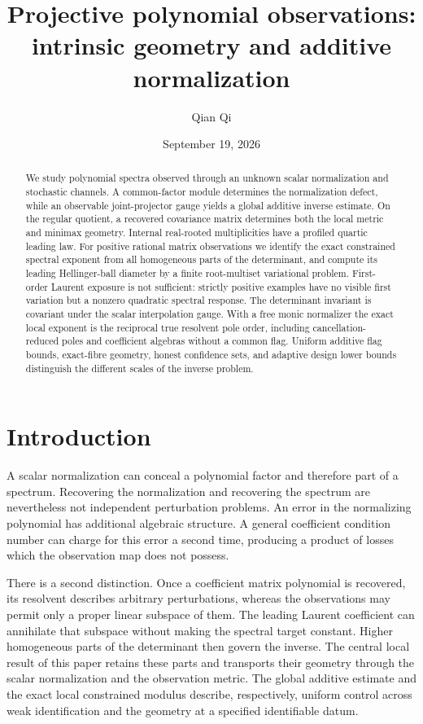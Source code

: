 \documentclass[11pt,reqno]{amsart}
\title[Projective polynomial observations]{Projective polynomial observations:\\ intrinsic geometry and additive normalization}
\author{Qian Qi}
\date{September 19, 2026}
\numberwithin{equation}{section}
\theoremstyle{definition}\newtheorem{definition}[theorem]{Definition}
\theoremstyle{remark}\newtheorem{remark}[theorem]{Remark}
\begin{document}
\begin{abstract}
We study polynomial spectra observed through an unknown scalar
normalization and stochastic channels. A common-factor module determines
the normalization defect, while an observable joint-projector gauge
yields a global additive inverse estimate. On the regular quotient,
a recovered covariance matrix determines both the local metric and
minimax geometry. Internal real-rooted multiplicities have a profiled
quartic leading law. For positive rational matrix observations we
identify the exact constrained spectral exponent from all homogeneous
parts of the determinant, and compute its leading Hellinger-ball
diameter by a finite root-multiset variational problem. First-order
Laurent exposure is not sufficient: strictly positive examples have
no visible first variation but a nonzero quadratic spectral response.
The determinant invariant is covariant under the scalar interpolation
gauge. With a free monic normalizer the exact local exponent is the
reciprocal true resolvent pole order, including cancellation-reduced
poles and coefficient algebras without a common flag. Uniform additive
flag bounds, exact-fibre geometry, honest confidence sets, and adaptive
design lower bounds distinguish the different scales of the inverse
problem.
\end{abstract}
\maketitle

\section{Introduction}
A scalar normalization can conceal a polynomial factor and therefore
part of a spectrum. Recovering the normalization and recovering the
spectrum are nevertheless not independent perturbation problems. An
error in the normalizing polynomial has additional algebraic structure.
A general coefficient condition number can charge for this error a
second time, producing a product of losses which the observation map
does not possess.

There is a second distinction. Once a coefficient matrix polynomial
is recovered, its resolvent describes arbitrary perturbations, whereas
the observations may permit only a proper linear subspace of them.
The leading Laurent coefficient can annihilate that subspace without
making the spectral target constant. Higher homogeneous parts of the
determinant then govern the inverse. The central local result of this
paper retains these parts and transports their geometry through the
scalar normalization and the observation metric. The global additive
estimate and the exact local constrained modulus describe, respectively,
uniform control across weak identification and the geometry at a
specified identifiable datum.
\end{document}
